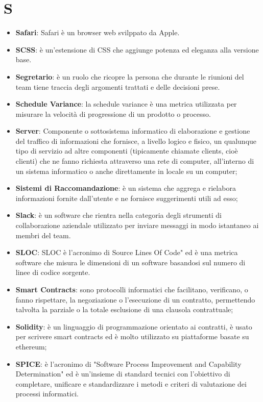 \documentclass[a4paper, oneside, openany]{article}
\begin{document}
\section{S}
\begin{itemize}
\item \textbf{Safari}: Safari è un browser web svilppato da Apple.
\item \textbf{SCSS}: è un'estensione di CSS che aggiunge potenza ed eleganza alla versione base.
\item \textbf{Segretario}: è un ruolo che ricopre la persona che durante le riunioni del team tiene traccia degli argomenti trattati e delle decisioni prese.
\item \textbf{Schedule Variance}: la schedule variance è una metrica utilizzata per misurare la velocità di progressione di un prodotto o processo.
\item \textbf{Server}: Componente o sottosistema informatico di elaborazione e gestione del traffico di informazioni che fornisce, a livello logico e fisico, un qualunque tipo di servizio ad altre componenti (tipicamente chiamate clients, cioè clienti) che ne fanno richiesta attraverso una rete di computer, all’interno di un sistema informatico o anche direttamente in locale su un computer;
\item \textbf{Sistemi di Raccomandazione}: è un sistema che aggrega e rielabora informazioni fornite dall'utente e ne fornisce suggerimenti utili ad esso;
\item \textbf{Slack}: è un software che rientra nella categoria degli strumenti di collaborazione aziendale utilizzato per inviare messaggi in modo istantaneo ai membri del team.
\item \textbf{SLOC}: SLOC è l'acronimo di Source Lines Of Code"  ed è una metrica software che misura le dimensioni di un software basandosi sul numero di linee di codice sorgente.
\item \textbf{Smart Contracts}: sono protocolli informatici che facilitano, verificano, o fanno rispettare, la negoziazione o l'esecuzione di un contratto, permettendo talvolta la parziale o la totale esclusione di una clausola contrattuale;
\item \textbf{Solidity}: è un linguaggio di programmazione orientato ai contratti, è usato per scrivere smart contracts ed è molto utilizzato su piattaforme basate su ethereum;
\item \textbf{SPICE}: è l'acronimo di "Software Process Improvement and Capability Determination" ed è un'insieme di standard tecnici con l’obiettivo di completare, unificare e standardizzare i metodi e criteri di valutazione dei processi informatici.

\end{itemize}
\end{document}
